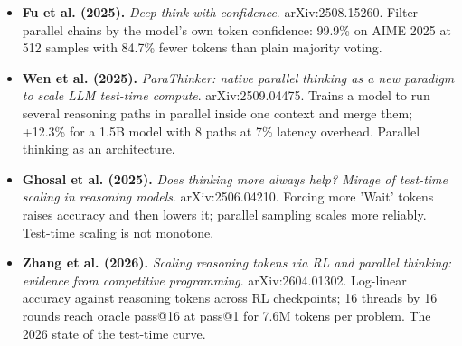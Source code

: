 \begin{itemize}[leftmargin=1.2em,itemsep=3pt]
\item \textbf{Fu et al. (2025).} \textit{Deep think with confidence}. arXiv:2508.15260. Filter parallel chains by the model's own token confidence: 99.9\% on AIME 2025 at 512 samples with 84.7\% fewer tokens than plain majority voting.
\item \textbf{Wen et al. (2025).} \textit{ParaThinker: native parallel thinking as a new paradigm to scale LLM test-time compute}. arXiv:2509.04475. Trains a model to run several reasoning paths in parallel inside one context and merge them; +12.3\% for a 1.5B model with 8 paths at 7\% latency overhead. Parallel thinking as an architecture.
\item \textbf{Ghosal et al. (2025).} \textit{Does thinking more always help? Mirage of test-time scaling in reasoning models}. arXiv:2506.04210. Forcing more 'Wait' tokens raises accuracy and then lowers it; parallel sampling scales more reliably. Test-time scaling is not monotone.
\item \textbf{Zhang et al. (2026).} \textit{Scaling reasoning tokens via RL and parallel thinking: evidence from competitive programming}. arXiv:2604.01302. Log-linear accuracy against reasoning tokens across RL checkpoints; 16 threads by 16 rounds reach oracle pass@16 at pass@1 for 7.6M tokens per problem. The 2026 state of the test-time curve.
\end{itemize}
